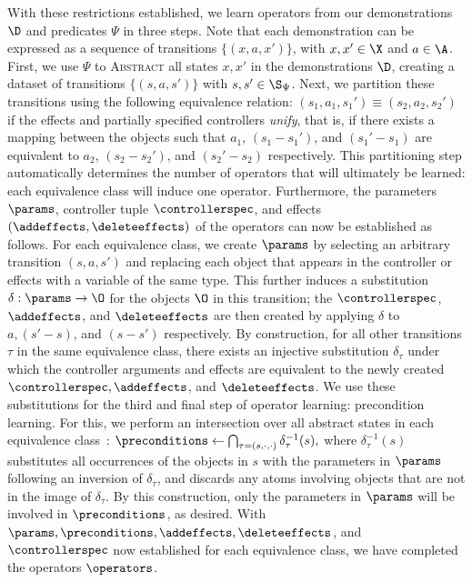 With these restrictions established, we learn operators from our demonstrations $\D$ and predicates $\Psi$ in three steps. Note that each demonstration can be expressed as a sequence of transitions $\{(x, a, x')\}$, with $x, x' \in \X$ and $a \in \A$.
First, we use $\Psi$ to \textsc{Abstract} all states $x, x'$ in the demonstrations $\D$, creating a dataset of transitions $\{(s, a, s')\}$ with $s, s' \in \S_\Psi$.
Next, we partition these transitions using the following equivalence relation: $(s_1, a_1, s_1') \equiv (s_2, a_2, s_2')$ if the effects and partially specified controllers \emph{unify}, that is, if there exists a mapping between the objects such that $a_1$, $(s_1 - s_1')$, and $(s_1' - s_1)$ are equivalent to $a_2$, $(s_2 - s_2')$, and $(s_2' - s_2)$ respectively.
This partitioning step automatically determines the number of operators that will ultimately be learned: each equivalence class will induce one operator.
Furthermore, the parameters $\params$, controller tuple $\controllerspec$, and effects $(\addeffects, \deleteeffects)$ of the operators can now be established as follows.
For each equivalence class, we create $\params$ by selecting an arbitrary transition $(s, a, s')$ and replacing each object that appears in the controller or effects with a variable of the same type. This further induces a substitution $\delta: \params \to \O$ for the objects $\O$ in this transition; the $\controllerspec$, $\addeffects$, and $\deleteeffects$ are then created by applying $\delta$ to $a, (s' - s)$, and $(s - s')$ respectively.
By construction, for all other transitions $\tau$ in the same equivalence class, there exists an injective substitution $\delta_\tau$ under which the controller arguments and effects are equivalent to the newly created $\controllerspec, \addeffects$, and $\deleteeffects$.
We use these substitutions for the third and final step of operator learning: precondition learning.
For this, we perform an intersection over all abstract states in each equivalence class~\cite{bonet2019learning,chitnis2021learning,curtis2021discovering}: $\preconditions \gets \bigcap_{\tau=(s, \cdot, \cdot)} \delta^{-1}_\tau(s),$
where $\delta^{-1}_\tau(s)$  substitutes all occurrences of the objects in $s$ with the parameters in $\params$ following an inversion of $\delta_\tau$, and discards any atoms involving objects that are not in the image of $\delta_\tau$.
By this construction, only the parameters in $\params$ will be involved in $\preconditions$, as desired.
With $\params, \preconditions, \addeffects, \deleteeffects$, and $\controllerspec$ now established for each equivalence class, we have completed the operators $\operators$.

